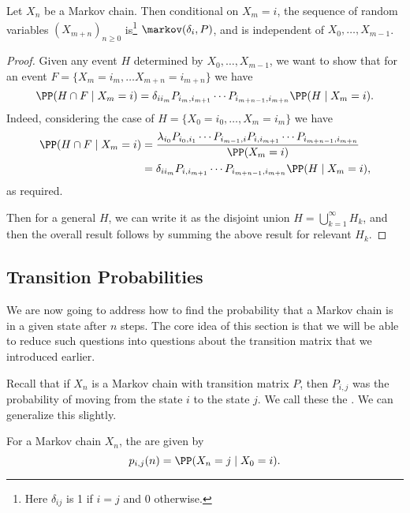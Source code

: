 \documentclass[a4paper]{scrartcl}
\begin{document}
\begin{theorem}
	Let $X_n$ be a Markov chain. Then conditional on $X_m = i$, the sequence of random variables $(X_{m + n})_{n \geq 0}$ is\footnote{Here $\delta_{ij}$ is 1 if $i = j$ and 0 otherwise.} $\markov(\delta_i, P)$, and is independent of $X_0, \dots, X_{m - 1}$.
\end{theorem}
\begin{proof}
	Given any event $H$ determined by $X_0, \dots, X_{m - 1}$, we want to show that for an event $F = \{X_m = i_m, \dots X_{m + n} = i_{m +n}\}$ we have
	$$
	\PP(H \cap F \mid X_m = i) = \delta_{ii_m}P_{i_m, i_{m + 1}} \cdots P_{i_{m + n-1}, i_{m + n}} \PP(H \mid X_m = i).
	$$
	Indeed, considering the case of $H = \{X_0 = i_0, \dots, X_m = i_m\}$ we have
	\begin{align*}
		\PP(H \cap F \mid X_m = i) &= \frac{\lambda_{i_0}P_{i_0, i_1} \cdots P_{i_{m - 1}, i}P_{i, i_{m + 1}} \cdots P_{i_{m + n - 1}, i_{m + n}}}{\PP(X_m = i)} \\
		&= \delta_{i i_m}P_{i, i_{m + 1}} \cdots P_{i_{m + n - 1}, i_{m + n}} \PP(H \mid X_m = i),
	\end{align*}
	as required. 
	
	Then for a general $H$, we can write it as the disjoint union $H = \bigcup_{k = 1}^{\infty} H_k$, and then the overall result follows by summing the above result for relevant $H_k$.
\end{proof}

\subsection{Transition Probabilities}

We are now going to address how to find the probability that a Markov chain is in a given state after $n$ steps.
The core idea of this section is that we will be able to reduce such questions into questions about the transition matrix that we introduced earlier.

Recall that if $X_n$ is a Markov chain with transition matrix $P$, then $P_{i, j}$ was the probability of moving from the state $i$ to the state $j$. We call these the . We can generalize this slightly.

\begin{definition}
	For a Markov chain $X_n$, the  are given by
	$$
	p_{i, j}(n) = \PP(X_n = j \mid X_0 = i).
	$$
\end{definition}
\end{document}
